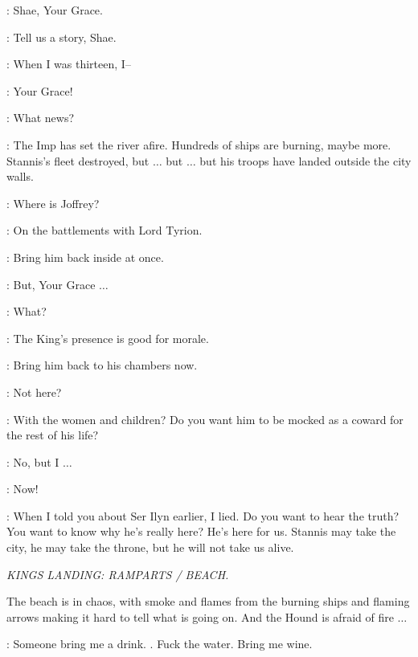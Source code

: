 \SHAE: Shae, Your Grace. 

\CERSEI: Tell us a story, Shae. 


\SHAE: When I was thirteen, I-- 


\LANCEL: Your Grace! 

\CERSEI: What news? 

\LANCEL: The Imp has set the river afire. Hundreds of ships are burning, maybe more. Stannis's fleet destroyed, but $\ldots$ but $\ldots$ but his troops have landed outside the city walls. 

\CERSEI: Where is Joffrey? 

\LANCEL: On the battlements with Lord Tyrion. 

\CERSEI: Bring him back inside at once. 

\LANCEL: But, Your Grace $\ldots$  

\CERSEI: What? 

\LANCEL: The King's presence is good for morale. 

\CERSEI: Bring him back to his chambers now. 

\LANCEL: Not here? 

\CERSEI: With the women and children? Do you want him to be mocked as a coward for the rest of his life? 

\LANCEL: No, but I $\ldots$  

\CERSEI: Now! 


\CERSEI: When I told you about Ser Ilyn earlier, I lied. Do you want to hear the truth? You want to know why he's really here? He's here for us. Stannis may take the city, he may take the throne, but he will not take us alive. 


\scene

\textit{KINGS LANDING: RAMPARTS / BEACH.}


\n The beach is in chaos, with smoke and flames from the burning ships and flaming arrows making it hard to tell what is going on. And the Hound is afraid of fire $\ldots$


\HOUND: Someone bring me a drink. . Fuck the water.  Bring me wine. 

